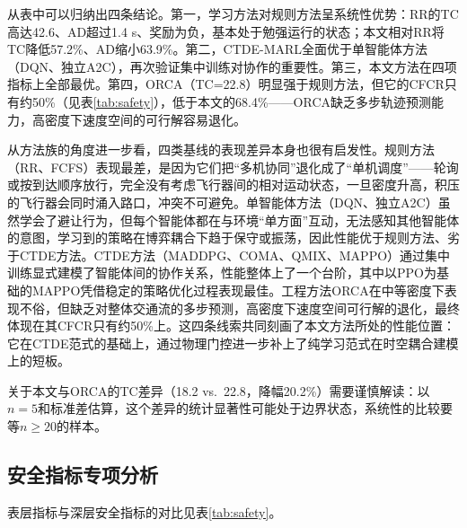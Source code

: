 \documentclass[12pt,a4paper,UTF8]{ctexart}
\begin{document}
从表中可以归纳出四条结论。第一，学习方法对规则方法呈系统性优势：RR的TC高达42.6、AD超过1.4 s、奖励为负，基本处于勉强运行的状态；本文相对RR将TC降低57.2\%、AD缩小63.9\%。第二，CTDE-MARL全面优于单智能体方法（DQN、独立A2C），再次验证集中训练对协作的重要性。第三，本文方法在四项指标上全部最优。第四，ORCA（TC=22.8）明显强于规则方法，但它的CFCR只有约50\%（见表\ref{tab:safety}），低于本文的68.4\%——ORCA缺乏多步轨迹预测能力，高密度下速度空间的可行解容易退化。

从方法族的角度进一步看，四类基线的表现差异本身也很有启发性。规则方法（RR、FCFS）表现最差，是因为它们把“多机协同”退化成了“单机调度”——轮询或按到达顺序放行，完全没有考虑飞行器间的相对运动状态，一旦密度升高，积压的飞行器会同时涌入路口，冲突不可避免。单智能体方法（DQN、独立A2C）虽然学会了避让行为，但每个智能体都在与环境“单方面”互动，无法感知其他智能体的意图，学习到的策略在博弈耦合下趋于保守或振荡，因此性能优于规则方法、劣于CTDE方法。CTDE方法（MADDPG、COMA、QMIX、MAPPO）通过集中训练显式建模了智能体间的协作关系，性能整体上了一个台阶，其中以PPO为基础的MAPPO凭借稳定的策略优化过程表现最佳。工程方法ORCA在中等密度下表现不俗，但缺乏对整体交通流的多步预测，高密度下速度空间可行解的退化，最终体现在其CFCR只有约50\%上。这四条线索共同刻画了本文方法所处的性能位置：它在CTDE范式的基础上，通过物理门控进一步补上了纯学习范式在时空耦合建模上的短板。

关于本文与ORCA的TC差异（18.2 vs.\ 22.8，降幅20.2\%）需要谨慎解读：以$n=5$和标准差估算，这个差异的统计显著性可能处于边界状态，系统性的比较要等$n\geq20$的样本。

\subsection{安全指标专项分析}

表层指标与深层安全指标的对比见表\ref{tab:safety}。
\end{document}
